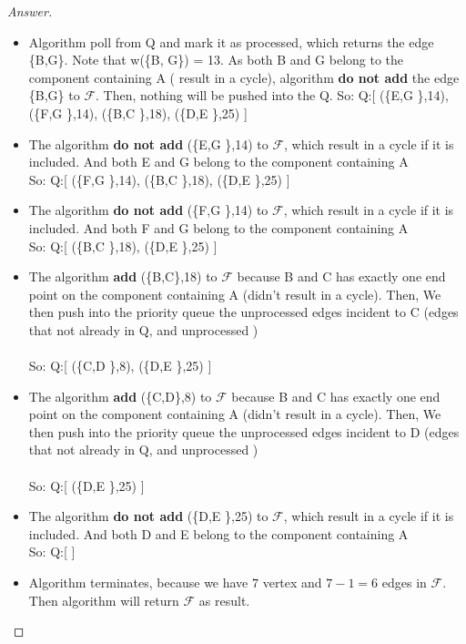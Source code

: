 \documentclass[11pt]{article}
\theoremstyle{definition}
\theoremstyle{definition}
\theoremstyle{definition}
\begin{document}
\begin{proof}[Answer]
\begin{itemize}
\item Algorithm poll from Q and mark it as processed, which returns the edge \{B,G\}. Note that w(\{B, G\}) = 13. As both B and G  belong to the component containing A ( result in a cycle), algorithm \textbf{do not add} the edge \{B,G\} to $\mathcal{F}$. Then, nothing will be pushed into the Q.
So:  Q:[  (\{E,G \},14), (\{F,G \},14), (\{B,C \},18), (\{D,E \},25) ]

\item The algorithm \textbf{do not add} (\{E,G \},14) to $\mathcal{F}$, which result in a cycle if it is included. And both E and G belong to the component containing A\\
So:  Q:[  (\{F,G \},14), (\{B,C \},18), (\{D,E \},25) ]

\item  The algorithm \textbf{do not add} (\{F,G \},14) to $\mathcal{F}$, which result in a cycle if it is included. And both F and G belong to the component containing A\\
So:  Q:[ (\{B,C \},18), (\{D,E \},25) ]

\item  The algorithm \textbf{add} (\{B,C\},18) to $\mathcal{F}$ because B and C has exactly one end point on the component containing A (didn't result in a cycle). Then, We then push into the priority queue the unprocessed edges incident to C (edges that not already in Q, and unprocessed )\\ \\ 
So:  Q:[ (\{C,D \},8), (\{D,E \},25) ]

\item  The algorithm \textbf{add} (\{C,D\},8) to $\mathcal{F}$ because B and C has exactly one end point on the component containing A (didn't result in a cycle). Then, We then push into the priority queue the unprocessed edges incident to D (edges that not already in Q, and unprocessed )\\ \\ 
So:  Q:[ (\{D,E \},25) ]

\item  The algorithm \textbf{do not add} (\{D,E \},25) to $\mathcal{F}$, which result in a cycle if it is included. And both D and E belong to the component containing A\\
So:  Q:[  ]
\item Algorithm terminates, because we have $7$ vertex and $7-1 = 6$ edges in  $\mathcal{F}$. Then algorithm will return $\mathcal{F}$ as result.
\end{itemize}
\end{proof}
\end{document}

